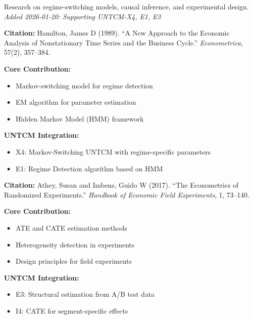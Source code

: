 Research on regime-switching models, causal inference, and experimental design.
\textit{Added 2026-01-20: Supporting UNTCM-X4, E1, E3}

\begin{tcolorbox}[colback=yellow!5!white,colframe=yellow!75!black,title=Key Paper: Hamilton (1989)]
\textbf{Citation:} Hamilton, James D (1989). ``A New Approach to the Economic Analysis of Nonstationary Time Series and the Business Cycle.'' \textit{Econometrica}, 57(2), 357--384.

\textbf{Core Contribution:}
\begin{itemize}[nosep]
    \item Markov-switching model for regime detection
    \item EM algorithm for parameter estimation
    \item Hidden Markov Model (HMM) framework
\end{itemize}

\textbf{UNTCM Integration:}
\begin{itemize}[nosep]
    \item X4: Markov-Switching UNTCM with regime-specific parameters
    \item E1: Regime Detection algorithm based on HMM
\end{itemize}
\end{tcolorbox}

\begin{tcolorbox}[colback=yellow!5!white,colframe=yellow!75!black,title=Key Paper: Athey \& Imbens (2017)]
\textbf{Citation:} Athey, Susan and Imbens, Guido W (2017). ``The Econometrics of Randomized Experiments.'' \textit{Handbook of Economic Field Experiments}, 1, 73--140.

\textbf{Core Contribution:}
\begin{itemize}[nosep]
    \item ATE and CATE estimation methods
    \item Heterogeneity detection in experiments
    \item Design principles for field experiments
\end{itemize}

\textbf{UNTCM Integration:}
\begin{itemize}[nosep]
    \item E3: Structural estimation from A/B test data
    \item I4: CATE for segment-specific effects
\end{itemize}
\end{tcolorbox}

